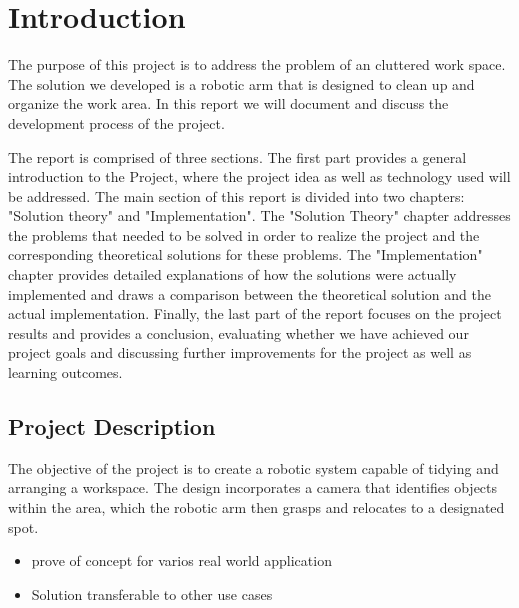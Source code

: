 
\chapter{Introduction} %
\label{CH1} %
The purpose of this project is to address the problem of an cluttered work space.
The solution we developed is a robotic arm that is designed to clean up and organize the work area. 
In this report we will document and discuss the development process of the project. 

The report is comprised of three sections. The first part provides a general introduction to the Project, where the project idea as well as technology used will be addressed. The main section of this report is divided into two chapters: "Solution theory" and "Implementation".
The "Solution Theory" chapter addresses the problems that needed to be solved in order to realize the project and the corresponding theoretical solutions for these problems. 
The "Implementation" chapter provides detailed explanations of how the solutions were actually implemented and draws a comparison between the theoretical solution and the actual implementation. Finally, the last part of the report focuses on the project results and provides a conclusion, evaluating whether we have achieved our project goals and discussing further improvements for the project as well as learning outcomes. 

\section{Project Description}

The objective of the project is to create a robotic system capable of tidying and arranging a workspace. The design incorporates a camera that identifies objects within the area, which the robotic arm then grasps and relocates to a designated spot.

\begin{itemize}
    \item prove of concept for varios real world application
    \item Solution transferable to other use cases
\end{itemize}


